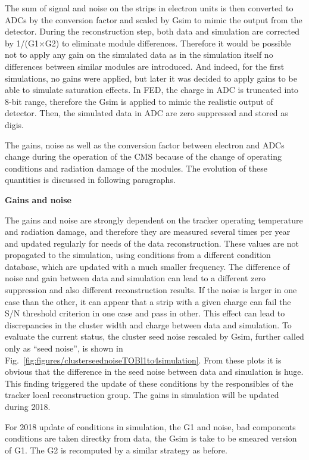  The sum of signal and noise on the strips in electron units is then converted to ADCs by the conversion factor and scaled by Gsim to mimic the output from the detector. During the reconstruction step, both data and simulation are corrected by 1/(G1$\times$G2) to eliminate module differences. Therefore it would be possible not to apply any gain on the simulated data as in the simulation itself no differences between similar modules are introduced. And indeed, for the first simulations, no gains were applied, but later it was decided to apply gains to be able to simulate saturation effects. In FED, the charge in ADC is truncated into 8-bit range, therefore the Gsim is applied to mimic the realistic output of detector. Then, the simulated data in ADC are zero suppressed and stored as digis.

The gains, noise as well as the conversion factor between electron and ADCs change during the operation of the CMS because of the change of operating conditions and radiation damage of the modules. The evolution of these quantities is discussed in following paragraphs.   
 
\textbf{Gains and noise}

The gains and noise are strongly dependent on the tracker operating temperature and radiation damage, and therefore they are measured several times per year and updated regularly for needs of the data reconstruction. These values are not propagated to the simulation, using conditions from a different condition database, which are updated with a much smaller frequency. The difference of noise and gain between data and simulation can lead to a different zero suppression and also different reconstruction results. If the noise is larger in one case than the other, it can appear that a strip with a given charge can fail the S/N threshold criterion in one case and pass in other. This effect can lead to discrepancies in the cluster width and charge between data and simulation. To evaluate the current status, the cluster seed noise rescaled by Gsim, further called only as ``seed noise'', is shown in Fig.~\ref{fig:figures/clusterseednoiseTOBl1to4simulation}. From these plots it is obvious that the difference in the seed noise between data and simulation is huge. This finding triggered the update of these conditions by the responsibles of the tracker local reconstruction group. The gains in simulation will be updated during 2018.

For 2018  update of conditions in simulation, the G1 and noise, bad components conditions are taken directky from data, the Gsim is take to be smeared version of G1. The G2 is recomputed by a similar strategy as before.


